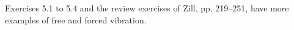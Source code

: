 \begin{exercise}
Exercises 5.1 to 5.4 and the review exercises of Zill, pp. 219--251, have
more examples of free and forced vibration.
\end{exercise}

